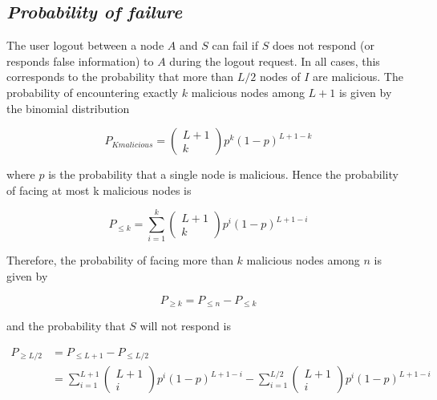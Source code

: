   \subsection{\textit{Probability of failure}}
    The user logout between a node $A$ and $S$ can fail if $S$ does
not respond (or responds false information) to $A$ during the logout request.
  In all cases, this corresponds to the probability that more than
$L/2$ nodes of $I$ are malicious. The probability of encountering exactly $k$
malicious nodes among $L +1$ is given by the binomial distribution

    \begin{equation}
      P_{K malicious} = \begin{pmatrix} L+1 \\ k\end{pmatrix} p^k (1-p)^{L+1-k}
    \end{equation}

    where $p$ is the probability that a single node is malicious. Hence the
probability of facing at most k malicious nodes is 

    \begin{equation}
      P_{\leq k} = \sum_{i=1}^{k} \begin{pmatrix} L+1 \\ k\end{pmatrix} p^i (1-p)^{L+1-i}
    \end{equation}

    Therefore, the probability of facing more than $k$ malicious nodes among
$n$ is given by

    \begin{equation}
      P_{\ge k} = P_{\leq n} - P_{\leq k}
    \end{equation}

    and the probability that $S$ will not respond is

    \begin{align}
      P_{\ge L/2} &= P_{\leq L+1} - P_{\leq L/2} \\
      &= \sum_{i=1}^{L+1} \begin{pmatrix} L+1 \\ i\end{pmatrix} p^i (1-p)^{L+1-i}
      - \sum_{i=1}^{L/2} \begin{pmatrix} L+1 \\ i\end{pmatrix} p^i (1-p)^{L+1-i}
    \end{align}


